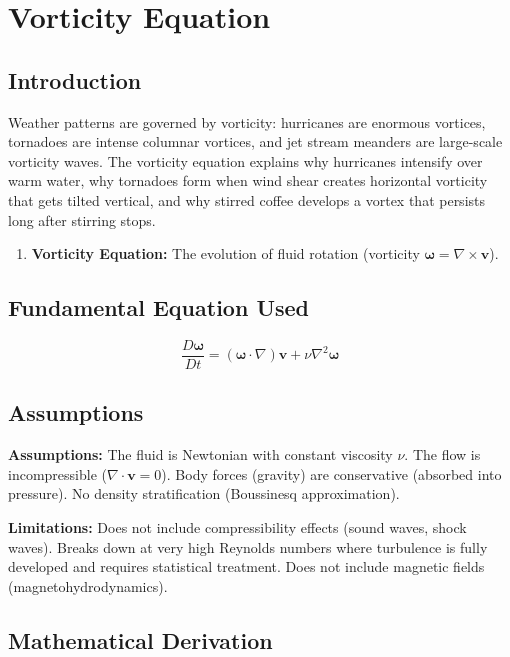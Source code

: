 \chapter{Vorticity Equation}

\section*{Introduction}

Weather patterns are governed by vorticity: hurricanes are enormous vortices, tornadoes are intense columnar vortices, and jet stream meanders are large-scale vorticity waves. The vorticity equation explains why hurricanes intensify over warm water, why tornadoes form when wind shear creates horizontal vorticity that gets tilted vertical, and why stirred coffee develops a vortex that persists long after stirring stops.

\begin{enumerate}
\item \textbf{Vorticity Equation:} The evolution of fluid rotation (vorticity $\boldsymbol{\omega} = \nabla \times \mathbf{v}$).

\end{enumerate}
\section*{Fundamental Equation Used}

\[
\frac{D\boldsymbol{\omega}}{Dt} = (\boldsymbol{\omega} \cdot \nabla)\mathbf{v} + \nu \nabla^2 \boldsymbol{\omega}
\]
\section*{Assumptions}

\textbf{Assumptions:} The fluid is Newtonian with constant viscosity $\nu$. The flow is incompressible ($\nabla \cdot \mathbf{v} = 0$). Body forces (gravity) are conservative (absorbed into pressure). No density stratification (Boussinesq approximation).


\textbf{Limitations:} Does not include compressibility effects (sound waves, shock waves). Breaks down at very high Reynolds numbers where turbulence is fully developed and requires statistical treatment. Does not include magnetic fields (magnetohydrodynamics).


\section*{Mathematical Derivation}

